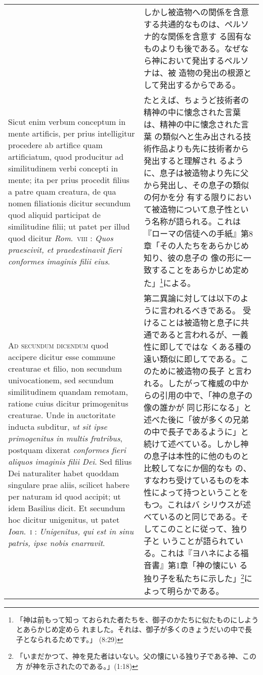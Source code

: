 \documentclass[10pt]{jsarticle} %
\begin{document}
\begin{longtable}{p{21em}p{21em}}
&

しかし被造物への関係を含意する共通的なものは、ペルソナ的な関係を含意す
 る固有なものよりも後である。なぜなら神において発出するペルソナは、被
 造物の発出の根源として発出するからである。

\\

Sicut enim
verbum conceptum in mente artificis, per prius intelligitur procedere
ab artifice quam artificiatum, quod producitur ad similitudinem verbi
concepti in mente; ita per prius procedit filius a patre quam
creatura, de qua nomen filiationis dicitur secundum quod aliquid
participat de similitudine filii; ut patet per illud quod dicitur
{\itshape Rom}.~{\scshape viii} : {\itshape Quos praescivit, et praedestinavit fieri conformes imaginis
filii eius}.

&

たとえば、ちょうど技術者の精神の中に懐念された言葉は、精神の中に懐念された言葉
 の類似へと生み出される技術作品よりも先に技術者から発出すると理解され
 るように、息子は被造物より先に父から発出し、その息子の類似の何かを分
 有する限りにおいて被造物について息子性という名称が語られる。これは
 『ローマの信徒への手紙』第8章「その人たちをあらかじめ知り、彼の息子の
 像の形に一致することをあらかじめ定めた」\footnote{「神は前もって知っ
 ておられた者たちを、御子のかたちに似たものにしようとあらかじめ定めら
 れました。それは、御子が多くのきょうだいの中で長子となられるためです。」
 (8:29)}による。

\\



{\scshape Ad secundum dicendum} quod accipere dicitur esse commune creaturae et
filio, non secundum univocationem, sed secundum similitudinem quandam
remotam, ratione cuius dicitur primogenitus creaturae. Unde in
auctoritate inducta subditur, {\itshape ut sit ipse primogenitus in multis
fratribus}, postquam dixerat {\itshape conformes fieri aliquos imaginis filii
Dei}. Sed filius Dei naturaliter habet quoddam singulare prae aliis,
scilicet habere per naturam id quod accipit; ut idem Basilius
dicit. Et secundum hoc dicitur unigenitus, ut patet {\itshape
 Ioan}.~{\scshape i} : {\itshape Unigenitus, qui est in sinu patris, ipse nobis enarravit}.

&

第二異論に対しては以下のように言われるべきである。
受けることは被造物と息子に共通であると言われるが、一義性に即してではな
 くある種の遠い類似に即してである。このために被造物の長子
と言われる。したがって権威の中からの引用の中で、「神の息子の像の誰かが
 同じ形になる」と述べた後に「彼が多くの兄弟の中で長子であるように」と
 続けて述べている。しかし神の息子は本性的に他のものと比較してなにか個的なも
 の、すなわち受けているものを本性によって持つということをもつ。これはバ
 シリウスが述べているのと同じである。そしてこのことに従って、独り子と
 いうことが語られている。これは『ヨハネによる福音書』第1章「神の懐にい
 る独り子を私たちに示した」\footnote{「いまだかつて、神を見た者はいない。父の懐にいる独り子である神、この方
 が神を示されたのである。」(1:18)}によって明らかである。


\end{longtable}
\end{document}
